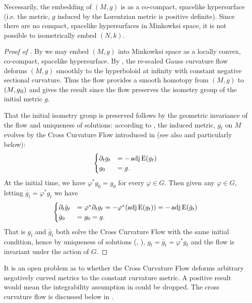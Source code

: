 \documentclass[a4paper, 12pt]{amsart}
\begin{document}
\begin{rem}
Necessarily, the embedding of \((M, g)\) is as a co-compact, spacelike hypersurface (i.e. the metric, \(g\) induced by the Lorentzian metric is positive definite). Since there are no compact, spacelike hypersurfaces in Minkowksi space, it is not possible to isometrically embed \((N, k)\).
\end{rem}

\begin{proof}
[Proof of ]

By  we may embed \((M, g)\) into Minkowksi space as a locally convex, co-compact, spacelike hypersurface. By \cite[Theorem 1.1]{MR3344442}, the re-scaled Gauss curvature flow deforms \((M, g)\) smoothly to the hyperboloid at infinity with constant negative sectional curvature. Thus the flow provides a smooth homotopy from \((M, g)\) to \((M, g_{\mathbb{H}})\) and  gives the result since the flow preserves the isometry group of the initial metric \(g\).

That the initial isometry group is preserved follows by the geometric invariance of the flow and uniqueness of solutions: according to \cite[12. Application to the cross-curvature flow]{MR3344442}, the induced metric, \(g_t\) on \(M\) evolves by the Cross Curvature Flow introduced in \cite{MR2055396} (see also  and particularly  below):
\[
\begin{cases}
\partial_t g_t &= -\operatorname{adj}\operatorname{E}(g_t) \\
g_0 &= g.
\end{cases}
\]
At the initial time, we have \(\varphi^{\ast} g_0 = g_0\) for every \(\varphi \in G\). Then given any \(\varphi \in G\), letting \(\bar{g}_t = \varphi^{\ast} g_t\) we have
\[
\begin{cases}
\partial_t \bar{g}_t &= \varphi^{\ast} \partial_t g_t = -\varphi^{\ast}(\operatorname{adj}\operatorname{E}(g_t)) = -\operatorname{adj}\operatorname{E}(\bar{g}_t) \\
\bar{g}_0 &= g_0 = g.
\end{cases}
\]
That is \(g_t\) and \(\bar{g}_t\) both solve the Cross Curvature Flow with the same initial condition, hence by uniqueness of solutions (\cite{MR2055396,MR2207496}, ), \(g_t = \bar{g}_t = \varphi^{\ast} g_t\) and the flow is invariant under the action of \(G\).
\end{proof}

\begin{rem}
It is an open problem as to whether the Cross Curvature Flow deforms arbitrary negatively curved metrics to the constant curvature metric. A positive result would mean the integrability assumption in  could be dropped. The cross curvature flow is discussed below in .
\end{rem}
\end{document}
